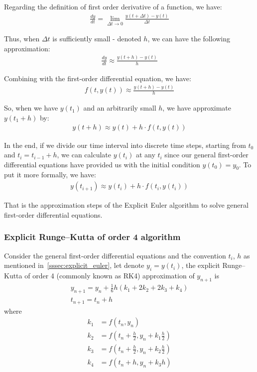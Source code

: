 \documentclass[a4paper]{article}
\begin{document}
Regarding the definition of first order derivative of a function, we have:
\begin{align*}
  \frac{dy}{dt} = \lim_{\Delta t \rightarrow 0} \frac{y(t + \Delta t) - y(t)}{\Delta t}
\end{align*}

Thus, when \(\Delta t\) is sufficiently small - denoted \(h\), we can have the following approximation:
\begin{align*}
  \frac{dy}{dt} \approx \frac{y(t + h) - y(t)}{h}
\end{align*}

Combining with the first-order differential equation, we have:
\begin{align*}
  f(t,y(t)) \approx \frac{y(t + h) - y(t)}{h}
\end{align*}

So, when we have \(y(t_1)\) and an arbitrarily small \(h\), we have approximate \(y(t_1 + h)\) by:
\begin{align*}
  y(t + h) \approx y(t) + h \cdot f(t,y(t))
\end{align*}

In the end, if we divide our time interval into discrete time steps, starting from \(t_0\) and \(t_i = t_{i-1} + h\), we can calculate \(y(t_i)\) at any \(t_i\) since our general first-order differential equations have provided us with the initial condition \(y(t_0) = y_0\). To put it more formally, we have:
\begin{align*}
  y(t_{i+1}) \approx y(t_i) + h \cdot f(t_i, y(t_i))
\end{align*}

That is the approximation steps of the Explicit Euler algorithm to solve general first-order differential equations.

\subsubsection{Explicit Runge–Kutta of order 4 algorithm}
Consider the general first-order differential equations and the convention \(t_i\), \(h\) as mentioned in~\ref{sssec:explicit_euler}, let denote \(y_i = y(t_i)\), the explicit Runge–Kutta of order 4 (commonly known as RK4) approximation of \(y_{n+1}\) is
\begin{align*}
  y_{n+1} = y_n + \frac{1}{6}h(k_1 + 2k_2 + 2k_3 + k_4) \\
  t_{n+1} = t_n + h
\end{align*}
where
\begin{align*}
  k_1 & = f(t_n, y_n)                                \\
  k_2 & = f(t_n + \frac{h}{2}, y_n + k_1\frac{h}{2}) \\
  k_3 & = f(t_n + \frac{h}{2}, y_n + k_2\frac{h}{2}) \\
  k_4 & = f(t_n + h, y_n + k_3h)
\end{align*}
\end{document}
